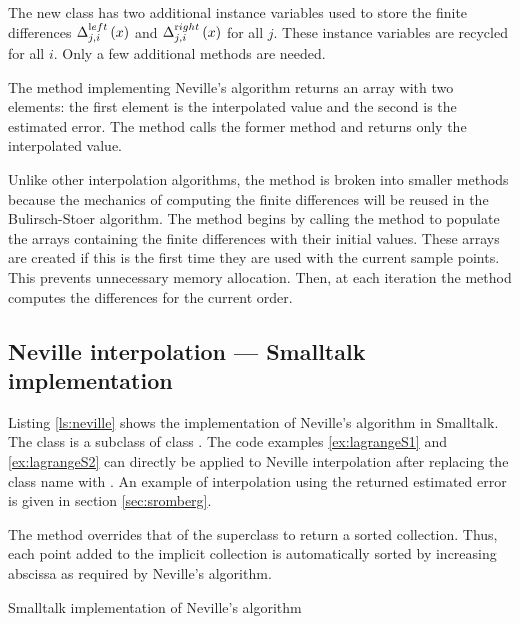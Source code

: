 The new class has two additional instance variables used to store
the finite differences $\Delta_{j,i}^{\mathop{\textrm
left}}\left(x\right)$ and $\Delta_{j,i}^{\mathop{\textrm
right}}\left(x\right)$ for all $j$. These instance variables are
recycled for all $i$. Only a few additional methods are needed.

The method  implementing Neville's algorithm
returns an array with two elements: the first element is the
interpolated value and the second is the estimated error. The
method  calls the former method and returns only the
interpolated value.

Unlike other interpolation algorithms, the method  is broken into smaller methods because the
mechanics of computing the finite differences will be reused in
the Bulirsch-Stoer algorithm. The method 
begins by calling the method  to
populate the arrays containing the finite differences with their
initial values. These arrays are created if this is the first time
they are used with the current sample points. This prevents
unnecessary memory allocation. Then, at each iteration the method  computes the differences for the current order.

\subsection{ Neville interpolation --- Smalltalk  implementation}
Listing \ref{ls:neville} shows the implementation of Neville's
algorithm in Smalltalk. The class  is
a subclass of class . The code
examples \ref{ex:lagrangeS1} and \ref{ex:lagrangeS2} can directly
be applied to Neville interpolation after replacing the class name
 with .
An example of interpolation using the returned estimated error is
given in section \ref{sec:sromberg}.

The method  overrides that of the
superclass to return a sorted collection. Thus, each point added
to the implicit collection is automatically sorted by increasing
abscissa as required by Neville's algorithm.
\begin{listing}
  Smalltalk implementation of Neville's algorithm
\label{ls:neville}

\end{listing}

